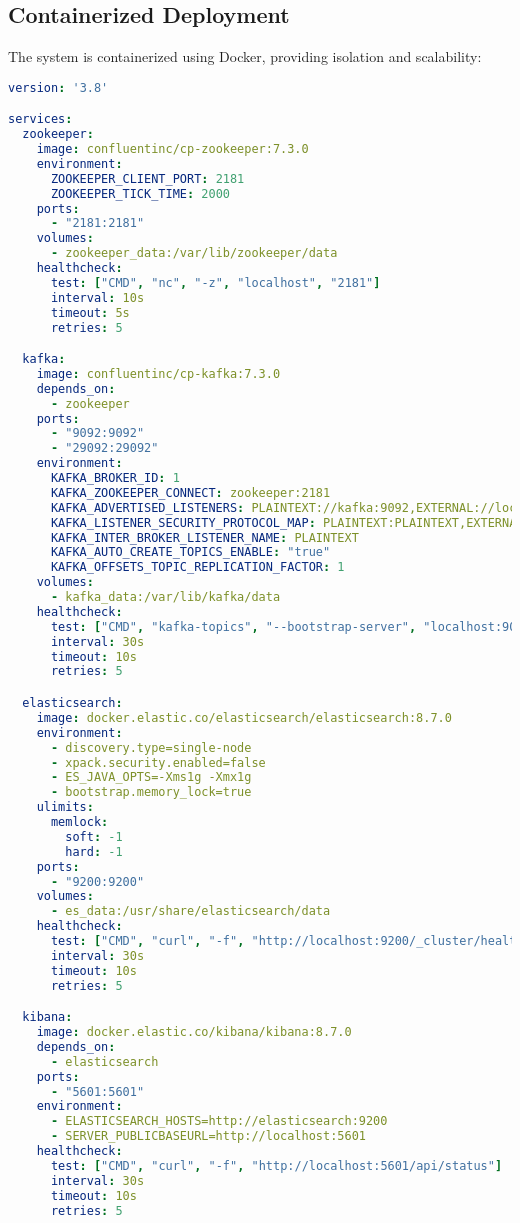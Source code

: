 \documentclass[11pt, a4paper]{article}
\newenvironment{customcode}[1]{
  \begin{tcolorbox}[
    enhanced,
    colback=codebg,
    colframe=codeframe,
    arc=0pt,
    outer arc=0pt,
    boxrule=1pt,
    left=10pt,
    right=10pt,
    top=10pt,
    bottom=10pt,
    title={#1},
    fonttitle=\sffamily\bfseries\color{mainblue},
    coltitle=white,
    colbacktitle=secondaryblue,
    attach boxed title to top left={xshift=10pt, yshift=-\tcboxedtitleheight/2},
    boxed title style={
      sharp corners,
      boxrule=0pt,
    },
  ]
}{
  \end{tcolorbox}
}
\begin{document}
\clearpage
\subsection{Containerized Deployment}
The system is containerized using Docker, providing isolation and scalability:

\begin{customcode}{Docker Compose Configuration (YAML)}
\begin{lstlisting}[language=yaml]
version: '3.8'

services:
  zookeeper:
    image: confluentinc/cp-zookeeper:7.3.0
    environment:
      ZOOKEEPER_CLIENT_PORT: 2181
      ZOOKEEPER_TICK_TIME: 2000
    ports:
      - "2181:2181"
    volumes:
      - zookeeper_data:/var/lib/zookeeper/data
    healthcheck:
      test: ["CMD", "nc", "-z", "localhost", "2181"]
      interval: 10s
      timeout: 5s
      retries: 5

  kafka:
    image: confluentinc/cp-kafka:7.3.0
    depends_on:
      - zookeeper
    ports:
      - "9092:9092"
      - "29092:29092"
    environment:
      KAFKA_BROKER_ID: 1
      KAFKA_ZOOKEEPER_CONNECT: zookeeper:2181
      KAFKA_ADVERTISED_LISTENERS: PLAINTEXT://kafka:9092,EXTERNAL://localhost:29092
      KAFKA_LISTENER_SECURITY_PROTOCOL_MAP: PLAINTEXT:PLAINTEXT,EXTERNAL:PLAINTEXT
      KAFKA_INTER_BROKER_LISTENER_NAME: PLAINTEXT
      KAFKA_AUTO_CREATE_TOPICS_ENABLE: "true"
      KAFKA_OFFSETS_TOPIC_REPLICATION_FACTOR: 1
    volumes:
      - kafka_data:/var/lib/kafka/data
    healthcheck:
      test: ["CMD", "kafka-topics", "--bootstrap-server", "localhost:9092", "--list"]
      interval: 30s
      timeout: 10s
      retries: 5

  elasticsearch:
    image: docker.elastic.co/elasticsearch/elasticsearch:8.7.0
    environment:
      - discovery.type=single-node
      - xpack.security.enabled=false
      - ES_JAVA_OPTS=-Xms1g -Xmx1g
      - bootstrap.memory_lock=true
    ulimits:
      memlock:
        soft: -1
        hard: -1
    ports:
      - "9200:9200"
    volumes:
      - es_data:/usr/share/elasticsearch/data
    healthcheck:
      test: ["CMD", "curl", "-f", "http://localhost:9200/_cluster/health"]
      interval: 30s
      timeout: 10s
      retries: 5

  kibana:
    image: docker.elastic.co/kibana/kibana:8.7.0
    depends_on:
      - elasticsearch
    ports:
      - "5601:5601"
    environment:
      - ELASTICSEARCH_HOSTS=http://elasticsearch:9200
      - SERVER_PUBLICBASEURL=http://localhost:5601
    healthcheck:
      test: ["CMD", "curl", "-f", "http://localhost:5601/api/status"]
      interval: 30s
      timeout: 10s
      retries: 5


\end{lstlisting}
\end{customcode}
\end{document}
